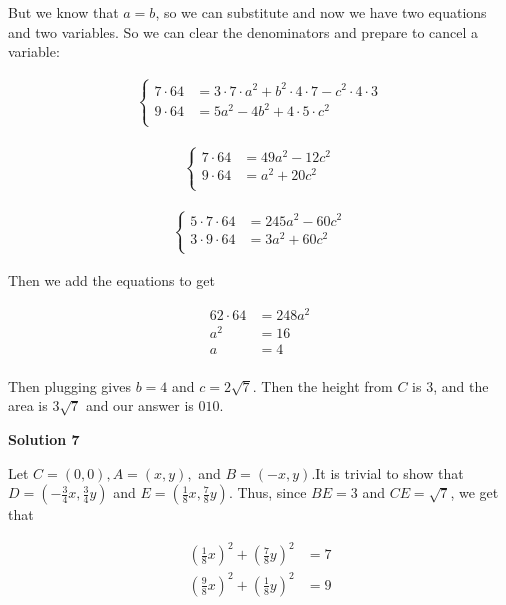 \begin{enumerate}
 But we know that $a=b$, so we can substitute and now we have two equations and two variables. So we can clear the denominators and prepare to cancel a variable:

 
 \begin{align*} \begin{cases} 7\cdot 64&=3\cdot 7\cdot a^2+b^2\cdot 4\cdot 7-c^2\cdot 4\cdot 3\\ 9\cdot 64&=5a^2-4b^2+4\cdot 5\cdot c^2 \\ \end{cases} \end{align*}


 \begin{align*} \begin{cases} 7\cdot 64&=49a^2-12c^2 \\ 9\cdot 64&=a^2+20c^2 \\ \end{cases} \end{align*}


 \begin{align*} \begin{cases} 5\cdot 7\cdot 64&=245a^2-60c^2 \\ 3\cdot 9\cdot 64&=3a^2+60c^2 \\ \end{cases} \end{align*}


 Then we add the equations to get

 
 \begin{align*} 62\cdot 64&=248a^2 \\ a^2 &=16 \\ a &=4 \\ \end{align*}


 Then plugging gives $b=4$ and $c=2\sqrt{7}$. Then the height from $C$ is $3$, and the area is $3\sqrt{7}$ and our answer is $\boxed{010}$.

 



\textbf{Solution 7}

Let $C=(0,0), A=(x,y),$ and $B=(-x,y)$.It is trivial to show that $D=\left(-\frac{3}{4}x,\frac{3}{4}y\right)$ and $E=\left(\frac{1}{8}x,\frac{7}{8}y\right)$. Thus, since $BE=3$ and $CE=\sqrt{7}$, we get that

 
 \begin{align*} \left(\frac{1}{8}x\right)^2+\left(\frac{7}{8}y\right)^2&=7 \\ \left(\frac{9}{8}x\right)^2+\left(\frac{1}{8}y\right)^2&=9 \\ \end{align*}



\end{enumerate}
